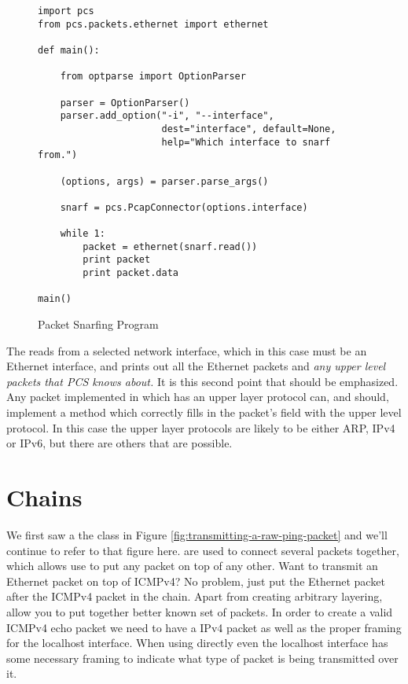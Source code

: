 \documentclass[11pt]{article}
\begin{document}
\begin{figure}
  \centering
\begin{verbatim}
import pcs
from pcs.packets.ethernet import ethernet

def main():

    from optparse import OptionParser

    parser = OptionParser()
    parser.add_option("-i", "--interface",
                      dest="interface", default=None,
                      help="Which interface to snarf from.")
    
    (options, args) = parser.parse_args()

    snarf = pcs.PcapConnector(options.interface)

    while 1:
        packet = ethernet(snarf.read())
        print packet
        print packet.data
        
main()
\end{verbatim}
  \caption{Packet Snarfing Program}
  \label{fig:packet-snarfing-program}
\end{figure}

The  reads from a selected network interface, which
in this case must be an Ethernet interface, and prints out all the
Ethernet packets and \emph{any upper level packets that PCS knows
  about.}  It is this second point that should be emphasized.  Any
packet implemented in  which has an upper layer protocol
can, and should, implement a  method which correctly
fills in the packet's  field with the upper level
protocol.  In this case the upper layer protocols are likely to be
either ARP, IPv4 or IPv6, but there are others that are possible.

\section{Chains}
\label{sec:chains}

We first saw a the  class in Figure
\ref{fig:transmitting-a-raw-ping-packet} and we'll continue to refer
to that figure here.   are used to connect several
packets together, which allows use to put any packet on top of any
other.  Want to transmit an Ethernet packet on top of ICMPv4?  No
problem, just put the Ethernet packet after the ICMPv4 packet in the
chain.  Apart from creating arbitrary layering,  allow
you to put together better known set of packets.  In order to create a
valid ICMPv4 echo packet we need to have a IPv4 packet as well as the
proper framing for the localhost interface.  When using 
directly even the localhost interface has some necessary framing to
indicate what type of packet is being transmitted over it.  
\end{document}
